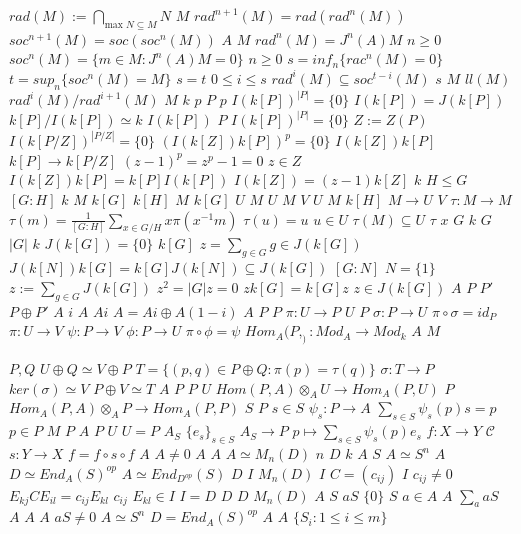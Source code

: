 \documentclass{article}
\begin{document}
$rad(M):=\bigcap_{\text{max } N \subseteq M} N$
$M$
$rad^{n+1}(M)=rad(rad^n(M))$
$soc^{n+1}(M)=soc(soc^n(M))$
$A$
$M$
$rad^n(M)=J^n(A)M$
$n \geq 0$
$soc^n(M)=\{m \in M:J^n(A)M=0\}$
$n \geq 0$
$s=inf_n\{rac^n(M)=0\}$
$t=sup_n\{soc^n(M)=M\}$
$s=t$
$0 \leq i \leq s$
$rad^i(M) \subseteq soc^{t-i}(M)$
$s$
$M$
$ll(M)$
$rad^i(M)/rad^{i+1}(M)$
$M$
$k$
$p$
$P$
$p$
$I(k[P])^{|P|}=\{0\}$
$I(k[P])=J(k[P])$
$k[P]/I(k[P]) \simeq k$
$I(k[P])$
$P$
$I(k[P])^{|P|}=\{0\}$
$Z:=Z(P)$
$I(k[P/Z])^{|P/Z|}=\{0\}$
$(I(k[Z])k[P])^p=\{0\}$
$I(k[Z])k[P]$
$k[P] \rightarrow k[P/Z]$
$(z-1)^p=z^p-1=0$
$z \in Z$
$I(k[Z])k[P]=k[P]I(k[P])$
$I(k[Z])=(z-1)k[Z]$
$k$
$H \leq G$
$[G:H]$
$k$
$M$
$k[G]$
$k[H]$
$M$
$k[G]$
$U$
$M$
$U$
$M$
$V$
$U$
$M$
$k[H]$
$M \rightarrow U$
$V$
$\tau:M \rightarrow M$
$\tau(m)=\frac{1}{[G:H]} \sum_{x \in G/H} x\pi(x^{-1}m)$
$\tau(u)=u$
$u \in U$
$\tau(M) \subseteq U$
$\tau$
$x$
$G$
$k$
$G$
$|G|$
$k$
$J(k[G])=\{0\}$
$k[G]$
$z= \sum_{g \in G} g \in J(k[G])$
$J(k[N])k[G]=k[G]J(k[N]) \subseteq J(k[G])$
$[G:N]$
$N=\{1\}$
$z:=\sum_{g \in G} J(k[G])$
$z^2=|G|z=0$
$zk[G]=k[G]z$
$z \in J(k[G])$
$A$
$P$
$P'$
$P \oplus P'$
$A$
$i$
$A$
$Ai$
$A=Ai \oplus A(1-i)$
$A$
$P$
$P$
$\pi:U \rightarrow P$
$U$
$P$
$\sigma:P \rightarrow U$
$\pi \circ \sigma =id_P$
$\pi:U \rightarrow V$
$\psi:P \rightarrow V$
$\phi:P \rightarrow U$
$\pi \circ \phi=\psi$
$Hom_A(P,_): Mod_A \rightarrow Mod_k$
$A$
$M$
$P,Q$
$U \oplus Q \simeq V \oplus P$
$T=\{(p,q) \in P \oplus Q:\pi(p)=\tau(q)\}$
$\sigma:T \rightarrow P$
$ker(\sigma) \simeq V$
$P \oplus V \simeq T$
$A$
$P$
$P$
$U$
$Hom(P,A) \otimes_A U \rightarrow Hom_A(P,U)$
$P$
$Hom_A(P,A) \otimes_A P \rightarrow Hom_A(P,P)$
$S$
$P$
$s \in S$
$\psi_s:P \rightarrow A$
$\sum_{s \in S}\psi_s(p)s=p$
$p \in P$
$M$
$P$
$A$
$P$
$U$
$U=P$
$A_S$
$\{e_s\}_{s \in S}$
$A_S \rightarrow P$
$p \mapsto \sum_{s \in S}\psi_s(p)e_s$
$f:X \rightarrow Y$
$\mathcal{C}$
$s:Y \rightarrow X$
$f=f \circ s \circ f$
$A$
$A \neq 0$
$A$
$A$
$A \simeq M_n(D)$
$n$
$D$
$k$
$A$
$S$
$A \simeq S^n$
$A$
$D \simeq End_A(S)^{op}$
$A \simeq End_{D^{op}}(S)$
$D$
$I$
$M_n(D)$
$I$
$C=(c_{ij})$
$I$
$c_{ij} \neq 0$
$E_{kj}CE_{il}=c_{ij}E_{kl}$
$c_{ij}$
$E_{kl} \in I$
$I=D$
$D$
$D$
$M_n(D)$
$A$
$S$
$aS$
$\{0\}$
$S$
$a \in A$
$A$
$\sum_a aS$
$A$
$A$
$A$
$aS \neq 0$
$A \simeq S^n$
$D=End_A(S)^{op}$
$A$
$A$
$\{S_i:1 \leq i \leq m\}$
\end{document}
